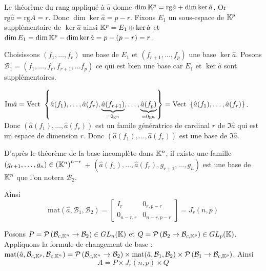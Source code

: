 \documentclass{article}
\begin{document}
\begin{question_kholle}
	Le théorème du rang appliqué à $\hat{a}$ donne $\dim \mathbb K^p = \mathrm{rg} \hat{a} + \dim \ker \hat{a}$. Or $\mathrm{rg} \hat{a} = \mathrm{rg} A = r$. Donc $\dim \ker \hat{a} = p - r$.
	Fixons $E_1$ un sous-espace de $\mathbb K^p$ supplémentaire de $\ker \hat{a}$ ainsi $\mathbb K^p = E_1 \oplus \ker \hat{a}$ et $\dim E_1 = \dim \mathbb K^p - \dim \ker \hat{a} = p - (p-r) = r$.
	
	Choisissons $\left(f_1, \ldots, f_r\right)$ une base de $E_1$ et $\left(f_{r+1}, \ldots, f_p\right)$ une base $\ker \hat{a}$.
	Posons $\mathcal{B}_1 = \left(f_1, \ldots, f_r, f_{r+1}, \ldots f_p\right)$ ce qui est bien une base car $E_1$ et $\ker \hat{a}$ sont supplémentaires.
	
	$\text{Im} \hat{a}
	= \text{Vect } \left\{\hat{a}(f_1), \ldots, \hat{a}(f_r), \underbrace{\hat{a}(f_{r+1})}_{= 0_{\mathbb K^n}}, \ldots, \underbrace{\hat{a}(f_p)}_{= 0_{\mathbb K^n}}\right\}
	= \text{Vect } \left\{\hat{a}(f_1), \ldots, \hat{a}(f_r)\right\}$. Donc $\left(\hat{a}(f_1), \ldots, \hat{a}(f_r)\right)$ est un famile génératrice de cardinal $r$ de $\Im \hat{a}$ qui est un espace de dimension $r$. Donc $\left(\hat{a}(f_1), \ldots, \hat{a}(f_r)\right)$ est une base de $\Im \hat{a}$.
	
	D'après le théorème de la base incomplète dans $\mathbb K^n$, il existe une famille $\left(g_{r+1}, \ldots, g_n\right) \in \left(\mathbb K^n\right)^{n-r}$ \tq+ $\left(\hat{a}(f_1), \ldots, \hat{a}(f_r), g_{r+1}, \ldots, g_n\right)$ est une base de $\mathbb K^n$ que l'on notera $\mathcal{B}_2$.
	
	Ainsi
	\begin{equation*}
		\mathrm{mat}(\hat{a}, \mathcal{B}_1, \mathcal{B}_2)
		= \left[ \begin{array}{c|c}
			I_r & 0_{r, p-r} \\
			\hline
			0_{n-r, r} & 0_{n-r, p-r}
		\end{array} \right]
		= J_r(n, p)
	\end{equation*}
	
	Posons $P = \mathcal{P} \left( \mathcal{B}_{c, \mathbb K^n} \to \mathcal{B}_2 \right) \in GL_n(\mathbb K)$ et $Q = \mathcal{P} \left( \mathcal{B}_2 \to \mathcal{B}_{c, \mathbb K^p} \right) \in GL_p(\mathbb K)$.
	Appliquons la formule de changement de base :
	$\mathrm{mat}(\hat{a}, \mathcal{B}_{c, \mathbb K^p}, \mathcal{B}_{c, \mathbb K^n})
	= \mathcal{P} \left( \mathcal{B}_{c, \mathbb K^n} \to \mathcal{B}_2 \right)
	\times \mathrm{mat}(\hat{a}, \mathcal{B}_1, \mathcal{B}_2)
	\times \mathcal{P} \left( \mathcal{B}_1 \to \mathcal{B}_{c, \mathbb K^p} \right)$.
	Ainsi
	\begin{equation*}
		A = P \times J_r(n, p) \times Q
	\end{equation*}
\end{question_kholle}
\end{document}
